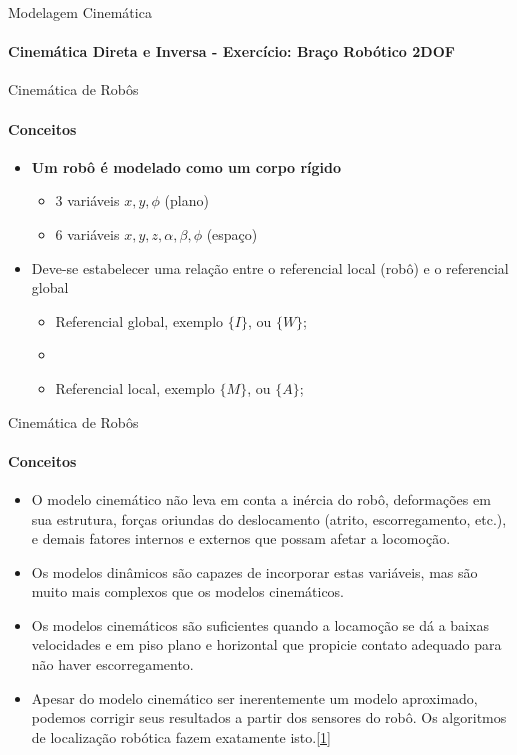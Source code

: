 \documentclass{beamer}
\begin{document}
\begin{frame}{Modelagem Cinemática}
    \framesubtitle{Cinemática Direta e Inversa - Exercício: Braço Robótico 2DOF}


\end{frame}


\begin{frame}{Cinemática de Robôs}
    \framesubtitle{Conceitos}
    \begin{itemize}
        \item \textbf{Um robô é modelado como um corpo rígido}
              \begin{itemize}
                  \item 3 variáveis $x, y,\phi$ (plano)
                  \item 6 variáveis $x,y,z, \alpha, \beta, \phi$ (espaço)
              \end{itemize}
        \item Deve-se estabelecer uma relação entre o referencial local (robô) e o referencial global
              \begin{itemize}
                  \item Referencial global, exemplo $\{I\}$, ou $\{W\}$;
                  \item \item Referencial local, exemplo $\{M\}$, ou $\{A\}$;
              \end{itemize}
    \end{itemize}
\end{frame}


\begin{frame}{Cinemática de Robôs}
    \framesubtitle{Conceitos}
    \begin{itemize}
        \item O modelo cinemático não leva em conta a inércia do robô, deformações em
              sua estrutura, forças oriundas do deslocamento (atrito, escorregamento, etc.),
              e demais fatores internos e externos que possam afetar a locomoção.
        \item Os modelos dinâmicos são capazes de incorporar estas variáveis, mas são
              muito mais complexos que os modelos cinemáticos.
        \item Os modelos cinemáticos são suficientes quando a locamoção se dá a baixas
              velocidades e em piso plano e horizontal que propicie contato adequado para
              não haver escorregamento.
        \item Apesar do modelo cinemático ser inerentemente um modelo aproximado,
              podemos corrigir seus resultados a partir dos sensores do robô. Os algoritmos
              de localização robótica fazem exatamente isto.\href{http://143.106.148.168:9080/Cursos/IA368N/01-16/cinematica2.pdf}{[1]}
    \end{itemize}
\end{frame}
\end{document}
